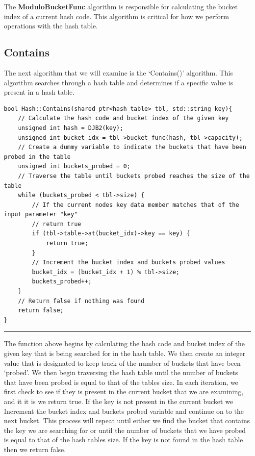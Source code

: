 \documentclass[a4paper,9pt]{article}
\newcommand{\horizontalline}{\noindent \rule{\textwidth}{0.5pt}\par}
\begin{document}
\noindent The \textbf{ModuloBucketFunc} algorithm is responsible for calculating the bucket index of a current hash code. This algorithm is critical for how we perform operations with the hash table.

\subsection*{Contains}

The next algorithm that we will examine is the `Contains()' algorithm. This algorithm searches through a hash table and determines if a specific value is present in a hash table.

\begin{highlight}

\begin{verbatim}
bool Hash::Contains(shared_ptr<hash_table> tbl, std::string key){
    // Calculate the hash code and bucket index of the given key
    unsigned int hash = DJB2(key);
    unsigned int bucket_idx = tbl->bucket_func(hash, tbl->capacity);
    // Create a dummy variable to indicate the buckets that have been probed in the table
    unsigned int buckets_probed = 0;
    // Traverse the table until buckets probed reaches the size of the table
    while (buckets_probed < tbl->size) {
        // If the current nodes key data member matches that of the input parameter "key" 
        // return true
        if (tbl->table->at(bucket_idx)->key == key) {
            return true;
        }
        // Increment the bucket index and buckets probed values
        bucket_idx = (bucket_idx + 1) % tbl->size;
        buckets_probed++;
    }
    // Return false if nothing was found
    return false;
}
\end{verbatim}

\horizontalline

The function above begins by calculating the hash code and bucket index of the given key that is being searched for in the hash table. We then create an integer value that is designated
to keep track of the number of buckets that have been `probed'. We then begin traversing the hash table until the number of buckets that have been probed is equal to that of the tables
size. In each iteration, we first check to see if they is present in the current bucket that we are examining, and it it is we return true. If the key is not present in the current bucket
we Increment the bucket index and buckets probed variable and continue on to the next bucket. This process will repeat until either we find the bucket that contains the key we are searching
for or until the number of buckets that we have probed is equal to that of the hash tables size. If the key is not found in the hash table then we return false.

\end{highlight}
\end{document}

